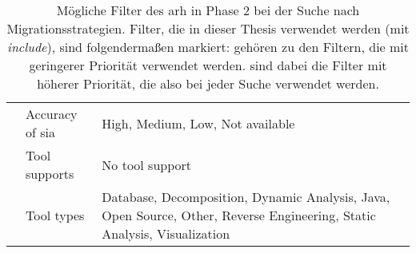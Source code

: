 \begin{table}
\begin{tabular}{m{2cm} m{2cm} m{9cm}}
    & Accuracy of \gls{sia} & High, Medium, Low, Not available \\ \cline{2-3}
    & Tool supports &  No tool support \\ \cline{2-3}
    & Tool types & Database, Decomposition, Dynamic Analysis, Java, Open Source, Other, Reverse Engineering, Static Analysis, Visualization \\
    \bottomrule
  \end{tabular}
  \caption[Mögliche Filter des \gls{arh} in Phase 2]{
  	Mögliche Filter des \gls{arh} in Phase 2 bei der Suche nach Migrationsstrategien.
  	Filter, die in dieser Thesis verwendet werden (mit \emph{include}), sind folgendermaßen markiert:
     gehören zu den Filtern, die mit geringerer Priorität verwendet werden.
     sind dabei die Filter mit höherer Priorität, die also bei jeder Suche verwendet werden.
  }
  \label{tab:phase2-all-filter}
\end{table}
